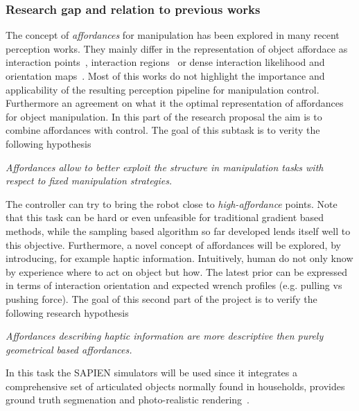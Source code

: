 \subsubsection{Research gap and relation to previous works}
The concept of \emph{affordances} for manipulation has been explored in many recent perception works. They mainly differ in the representation of object affordace as interaction points~\cite{gao2021kpam}, interaction regions~\cite{nagarajan2019grounded} or dense interaction likelihood and orientation maps~\cite{mo2021where2act}. Most of this works do not highlight the importance and applicability of the resulting perception pipeline for manipulation control. Furthermore an agreement on what it the optimal representation of affordances for object manipulation. In this part of the research proposal the aim is to combine affordances with control. The goal of this subtask is to verity the following hypothesis
\begin{displayquote}
\textit{Affordances allow to better exploit the structure in manipulation tasks with respect to fixed manipulation strategies.}
\end{displayquote}
The controller can try to bring the robot close to \emph{high-affordance} points. Note that this task can be hard or even unfeasible for traditional gradient based methods, while the sampling based algorithm so far developed lends itself well to this objective. 
Furthermore, a novel concept of affordances will be explored, by introducing, for example haptic information. Intuitively, human do not only know by experience where to act on object but how. The latest prior can be expressed in terms of interaction orientation and expected wrench profiles (e.g. pulling vs pushing force). The goal of this second part of the project is to verify the following research hypothesis
\begin{displayquote}
\textit{Affordances describing haptic information are more descriptive then purely geometrical based affordances.}
\end{displayquote} 
In this task the SAPIEN simulators will be used since it integrates a comprehensive set of articulated objects normally found in households, provides ground truth segmenation and photo-realistic rendering~\cite{Xiang_2020_SAPIEN}. 

